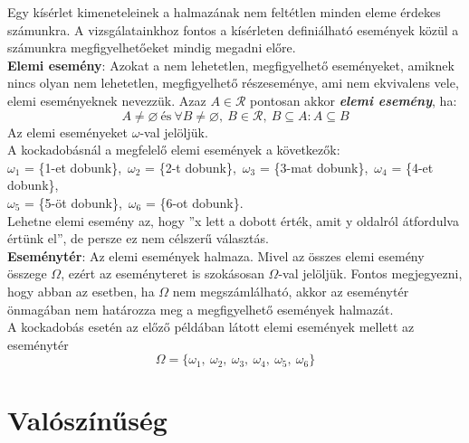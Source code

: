 \documentclass[tikz,12pt,margin=0px]{article}
\begin{document}
    \noindent Egy kísérlet kimeneteleinek a halmazának nem feltétlen minden eleme érdekes számunkra. A vizsgálatainkhoz fontos a kísérleten definiálható események közül a számunkra megfigyelhetőeket mindig megadni előre.\\

    \noindent \textbf{Elemi esemény}: Azokat a nem lehetetlen, megfigyelhető eseményeket, amiknek nincs olyan nem lehetetlen, megfigyelhető részeseménye, ami nem ekvivalens vele, elemi eseményeknek nevezzük. Azaz $A \in \mathcal{R}$ pontosan akkor \textbf{\emph{elemi esemény}}, ha:\\
    \[
        A \neq \varnothing\ \text{és}\ \forall B \neq \varnothing,\ B \in \mathcal{R},\ B \subseteq A : A \subseteq B
    \]
    Az elemi eseményeket $\omega$-val jelöljük.\\

    \noindent A kockadobásnál a megfelelő elemi események a következők:\\
    $\omega_1$ = \{1-et dobunk\},\ $\omega_2$ = \{2-t dobunk\},\ $\omega_3$ = \{3-mat dobunk\},\ $\omega_4$ = \{4-et dobunk\},\\
    $\omega_5$ = \{5-öt dobunk\},\ $\omega_6$ = \{6-ot dobunk\}.\\
    Lehetne elemi esemény az, hogy ”x lett a dobott érték, amit y oldalról átfordulva értünk el”, de persze ez nem célszerű választás.\\

    \noindent \textbf{Eseménytér}: Az elemi események halmaza. Mivel az összes elemi esemény összege $\Omega$, ezért az eseményteret is szokásosan $\Omega$-val jelöljük. Fontos megjegyezni, hogy abban az esetben, ha $\Omega$ nem megszámlálható, akkor az eseménytér önmagában nem határozza meg a megfigyelhető események halmazát.\\

    \noindent A kockadobás esetén az előző példában látott elemi események mellett az eseménytér
    \[\Omega = \{\omega_1,\ \omega_2,\ \omega_3,\ \omega_4,\ \omega_5,\ \omega_6\}\]

	\section*{Valószínűség}
\end{document}
